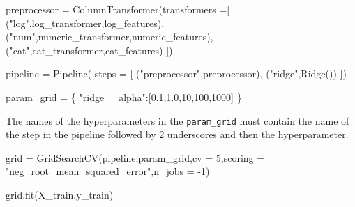 \documentclass[
  letterpaper,
  DIV=11,
  numbers=noendperiod]{scrartcl}
\newenvironment{Shaded}{\begin{snugshade}}{\end{snugshade}}
\newcommand{\DecValTok}[1]{\textcolor[rgb]{0.68,0.00,0.00}{#1}}
\newcommand{\FloatTok}[1]{\textcolor[rgb]{0.68,0.00,0.00}{#1}}
\newcommand{\NormalTok}[1]{\textcolor[rgb]{0.00,0.23,0.31}{#1}}
\newcommand{\OperatorTok}[1]{\textcolor[rgb]{0.37,0.37,0.37}{#1}}
\newcommand{\StringTok}[1]{\textcolor[rgb]{0.13,0.47,0.30}{#1}}
\begin{document}
\begin{Shaded}
\begin{Highlighting}[]
\NormalTok{preprocessor }\OperatorTok{=}\NormalTok{ ColumnTransformer(transformers }\OperatorTok{=}\NormalTok{[}
\NormalTok{    (}\StringTok{"log"}\NormalTok{,log\_transformer,log\_features),}
\NormalTok{    (}\StringTok{"num"}\NormalTok{,numeric\_transformer,numeric\_features),}
\NormalTok{    (}\StringTok{"cat"}\NormalTok{,cat\_transformer,cat\_features)}
\NormalTok{])}
\end{Highlighting}
\end{Shaded}

\begin{Shaded}
\begin{Highlighting}[]
\NormalTok{pipeline }\OperatorTok{=}\NormalTok{ Pipeline( steps }\OperatorTok{=}\NormalTok{ [}
\NormalTok{    (}\StringTok{"preprocessor"}\NormalTok{,preprocessor),}
\NormalTok{    (}\StringTok{"ridge"}\NormalTok{,Ridge())}
\NormalTok{])}
\end{Highlighting}
\end{Shaded}

\begin{Shaded}
\begin{Highlighting}[]
\NormalTok{param\_grid }\OperatorTok{=}\NormalTok{ \{}
    \StringTok{"ridge\_\_alpha"}\NormalTok{:[}\FloatTok{0.1}\NormalTok{,}\FloatTok{1.0}\NormalTok{,}\DecValTok{10}\NormalTok{,}\DecValTok{100}\NormalTok{,}\DecValTok{1000}\NormalTok{]}
\NormalTok{\}}
\end{Highlighting}
\end{Shaded}

The names of the hyperparameters in the \texttt{param\_grid} must
contain the name of the step in the pipeline followed by 2 underscores
and then the hyperparameter.

\begin{Shaded}
\begin{Highlighting}[]
\NormalTok{grid }\OperatorTok{=}\NormalTok{ GridSearchCV(pipeline,param\_grid,cv }\OperatorTok{=} \DecValTok{5}\NormalTok{,scoring }\OperatorTok{=} \StringTok{"neg\_root\_mean\_squared\_error"}\NormalTok{,n\_jobs }\OperatorTok{=} \OperatorTok{{-}}\DecValTok{1}\NormalTok{)}
\end{Highlighting}
\end{Shaded}

\begin{Shaded}
\begin{Highlighting}[]
\NormalTok{grid.fit(X\_train,y\_train)}
\end{Highlighting}
\end{Shaded}
\end{document}
